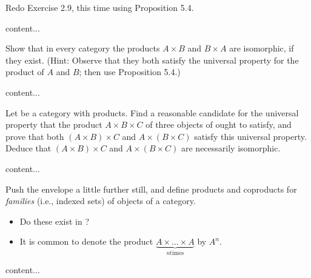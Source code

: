 \begin{exercise}
	Redo Exercise 2.9, this time using Proposition 5.4.
\end{exercise}
\begin{solution}
	content...
\end{solution}

\begin{exercise}
	Show that in every category  the products \(A \times B\) and \(B \times A\) are isomorphic, if they exist. (Hint: Observe that they both satisfy the universal property for the product of \(A\) and \(B\); then use Proposition 5.4.)
\end{exercise}
\begin{solution}
	content...
\end{solution}

\begin{exercise}
	Let  be a category with products. Find a reasonable candidate for the	universal property that the product \(A \times B \times C\) of three objects of  ought to satisfy, and prove that both \((A \times B) \times C\) and \(A \times (B \times C)\) satisfy this universal property. Deduce that \((A \times B) \times C\) and \(A \times (B \times C)\) are necessarily isomorphic.
\end{exercise}
\begin{solution}
	content...
\end{solution}

\begin{exercise}
	Push the envelope a little further still, and define products and coproducts for \textit{families} (i.e., indexed sets) of objects of a category.
	\begin{itemize}
		\item[] Do these exist in ?
		\item[] It is common to denote the product \(\underbrace{A \times \dots \times A}_{n \text{times}}\) by \(A^n\).
	\end{itemize}
\end{exercise}
\begin{solution}
	content...
\end{solution}

